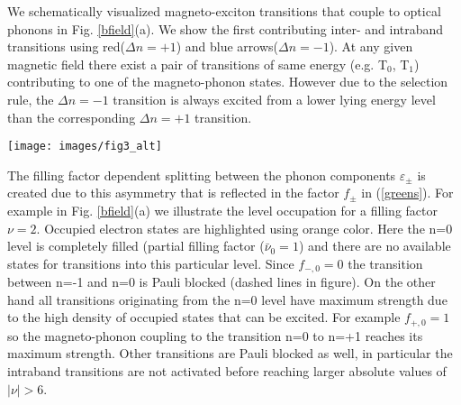 \documentclass[prl,aps,superscriptaddress,showpacs,reprint]{revtex4-1}
\begin{document}
We schematically visualized magneto-exciton transitions that couple to optical phonons in Fig. \ref{bfield}(a). We show the first contributing inter- and intraband transitions using red($\Delta n = +1$) and blue arrows($\Delta n = -1$). At any given magnetic field there exist a pair of transitions of same energy (e.g. T$_0$, T$_1$) contributing to one of the magneto-phonon states. However due to the selection rule, the $\Delta n = -1$ transition is always excited from a lower lying energy level than the corresponding $\Delta n = +1$ transition.  

\begin{figure*}
    \texttt{[image: images/fig3\_alt]}
    \caption{\label{bfield} a)Schematic view of the Landau level spectrum at B=12.6T, filling factor $\nu=2$ and Landau level transitions participating in magneto-phonon coupling. Filled electronic states are highlighted using orange color. Red and blue arrows show transitions allowed by the selection rule $\Delta\left|n\right|= \pm 1$. Dashed arrows mark Pauli blocked transitions. b) Relative strength and filling factor dependence of individual terms of the phonon self energy. Terms describing interband transitions are shaded red, intraband transitions are shaded green  c)Position of the graphene G-band during a gatesweep at $B=12.6T$. The energy of the G-Band was extracted from two-peak Lorentz fits to Raman spectra. Vertical orange lines mark specific filling factors at $\nu=-6,-2,0,2,6$ where the n=-1,0,1 levels are completely filled/depleted with charge carriers ($\nu=0$ - half filling of n=0 level). The calculated magneto-phonon energies according to equation \ref{greens} are plotted as solid red($\Delta n = +1$) and solid blue($\Delta n = -1$) lines. Dashed lines include $\Delta n = 0$ transitions.}
\end{figure*}

The filling factor dependent splitting between the phonon components $\varepsilon_{\pm}$ is created due to this asymmetry that is reflected in the factor $f_{\pm}$ in (\ref{greens}). For example in Fig. \ref{bfield}(a) we illustrate the level occupation for a filling factor $\nu=2$. Occupied electron states are highlighted using orange color. Here the n=0 level is completely filled (partial filling factor ($\bar{\nu}_0=1$) and there are no available states for transitions into this particular level. Since $f_{-,0}=0$ the transition between n=-1 and n=0 is Pauli blocked (dashed lines in figure). On the other hand all transitions originating from the n=0 level have maximum strength due to the high density of occupied states that can be excited. For example $f_{+,0}=1$ so the magneto-phonon coupling to the transition n=0 to n=+1 reaches its maximum strength. Other transitions are Pauli blocked as well, in particular the intraband transitions are not activated before reaching larger absolute values of $\left|\nu\right|>6$.
\end{document}
